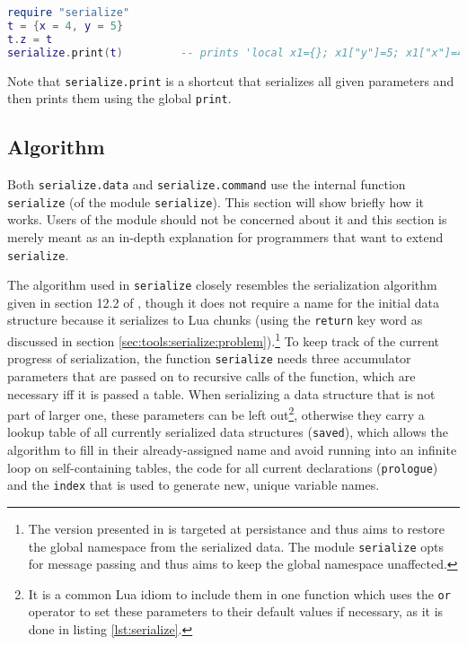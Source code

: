 \begin{lstlisting}[language=lua, caption={Serializing a recursive table}, label=lst:serializeprint, name=lst:serializeprint]
require "serialize"
t = {x = 4, y = 5}
t.z = t
serialize.print(t)         -- prints 'local x1={}; x1["y"]=5; x1["x"]=4; x1["z"]=x1; return (x1)'
\end{lstlisting}

Note that \texttt{serialize.print} is a shortcut that serializes all given parameters and then prints them using the global \texttt{print}.

\subsection{Algorithm}
\label{sec:tools:algorithm}

Both \texttt{serialize.data} and \texttt{serialize.command} use the internal function \texttt{serialize} (of the module \texttt{serialize}). This section will show briefly how it works. Users of the module should not be concerned about it and this section is merely meant as an in-depth explanation for programmers that want to extend \texttt{serialize}.

The algorithm used in \texttt{serialize} closely resembles the serialization algorithm given in section 12.2 of \cite{Ierusalimschy2006}, though it does not require a name for the initial data structure because it serializes to Lua chunks (using the \texttt{return} key word as discussed in section \ref{sec:tools:serialize:problem}).\footnote{The version presented in \cite{Ierusalimschy2006} is targeted at persistance and thus aims to restore the global namespace from the serialized data. The module \texttt{serialize} opts for message passing and thus aims to keep the global namespace unaffected.} To keep track of the current progress of serialization, the function \texttt{serialize} needs three accumulator parameters that are passed on to recursive calls of the function, which are necessary iff it is passed a table. When serializing a data structure that is not part of larger one, these parameters can be left out\footnote{It is a common Lua idiom to include them in one function which uses the \texttt{or} operator to set these parameters to their default values if necessary, as it is done in listing \ref{lst:serialize}.}, otherwise they carry a lookup table of all currently serialized data structures (\texttt{saved}), which allows the algorithm to fill in their already-assigned name and avoid running into an infinite loop on self-containing tables, the code for all current declarations (\texttt{prologue}) and the \texttt{index} that is used to generate new, unique variable names.

